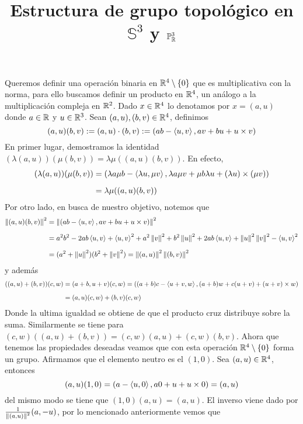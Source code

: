\documentclass{article}
\title{Estructura de grupo topológico en $\mathbb{S}^{3}$ y $\mathbb{P}^{3}_{\mathbb{R}}$}
\author{}
\date{}
\begin{document}
\maketitle

\noindent Queremos definir una operación binaria en $\mathbb{R}^{4}\setminus\{0\}$ que es multiplicativa 
con la norma, para ello buscamos definir un producto en $\mathbb{R}^{4}$, un análogo a la multiplicación 
compleja en $\mathbb{R}^{2}$. Dado $x\in\mathbb{R}^{4}$ lo denotamos por $x=(a,u)$ donde $a\in\mathbb{R}$ y $u\in\mathbb{R}^{3}$. 
Sean $(a,u),(b,v)\in\mathbb{R}^{4}$, definimos
\begin{equation*}
    (a,u)(b,v):=(a,u)\cdot(b,v):=(ab-\left\langle{u},{v}\right\rangle,av+bu+u\times v)
\end{equation*}
En primer lugar, demostramos la identidad $(\lambda(a,u))(\mu(b,v))=\lambda\mu((a,u)(b,v))$.
En efecto,
\begin{align*}
    (\lambda(a,u))(\mu(b,v)) &= (\lambda a\mu b-\left\langle{\lambda u},{\mu v}\right\rangle,\lambda a\mu v
    +\mu b\lambda u+(\lambda u)\times(\mu v)) \\[2mm]
    &= \lambda\mu((a,u)(b,v))
\end{align*}
Por otro lado, en busca de nuestro objetivo, notemos que
\begin{align*}
    \left \lVert (a,u)(b,v)\right \rVert^{2} &= \left \lVert (ab-\left\langle{u},{v}\right\rangle,av+bu+u\times v)\right \rVert^{2} \\[2mm]
    &= a^{2}b^{2}-2ab\left\langle{u},{v}\right\rangle+\left\langle{u},{v}\right\rangle^{2}+a^{2}\left \lVert v\right \rVert^{2}+b^{2}\left \lVert u\right \rVert^{2}+2ab\left\langle{u},{v}\right\rangle
    +\left \lVert u\right \rVert^{2}\left \lVert v\right \rVert^{2}-\left\langle{u},{v}\right\rangle^{2} \\[2mm]
    &= (a^{2}+\left \lVert u\right \rVert^{2})(b^{2}+\left \lVert v\right \rVert^{2})=\left \lVert (a,u)\right \rVert^{2}\left \lVert (b,v)\right \rVert^{2}
\end{align*}
y además
\begin{align*}
    ((a,u)+(b,v))(c,w) &= (a+b,u+v)(c,w)=((a+b)c-\left\langle{u+v},{w}\right\rangle,(a+b)w+c(u+v)+(u+v)\times w) \\[2mm]
    &= (a,u)(c,w)+(b,v)(c,w)
\end{align*}
Donde la ultima igualdad se obtiene de que el producto cruz distribuye sobre la suma. Similarmente 
se tiene para $(c,w)((a,u)+(b,v))=(c,w)(a,u)+(c,w)(b,v)$. Ahora que tenemos las propiedades 
deseadas veamos que con esta operación $\mathbb{R}^{4}\setminus\{0\}$ forma un grupo. Afirmamos que el 
elemento neutro es el $(1,0)$. Sea
$(a,u)\in\mathbb{R}^{4}$, entonces
\begin{equation*}
    (a,u)(1,0)=(a-\left\langle{u},{0}\right\rangle,a0+u+u\times0)=(a,u)
\end{equation*}
del mismo modo se tiene que $(1,0)(a,u)=(a,u)$. El inverso viene dado por 
$\frac{1}{\left \lVert (a,u)\right \rVert^{2}}(a,-u)$, por lo mencionado anteriormente vemos que
\end{document}
